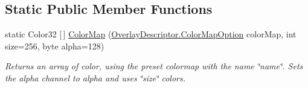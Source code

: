 \subsection*{Static Public Member Functions}
\begin{DoxyCompactItemize}
\item 
static Color32 \mbox{[}$\,$\mbox{]} \hyperlink{class_overlay_map_abe7d5d2e2d9895fd9116eb3f9f12d869}{Color\+Map} (\hyperlink{class_overlay_descriptor_ace98995d8c49c9395934100f3e5e1240}{Overlay\+Descriptor.\+Color\+Map\+Option} color\+Map, int size=256, byte alpha=128)
\begin{DoxyCompactList}\small\item\em Returns an array of color, using the preset colormap with the name \char`\"{}name\char`\"{}. Sets the alpha channel to alpha and uses \char`\"{}size\char`\"{} colors. \end{DoxyCompactList}\end{DoxyCompactItemize}
